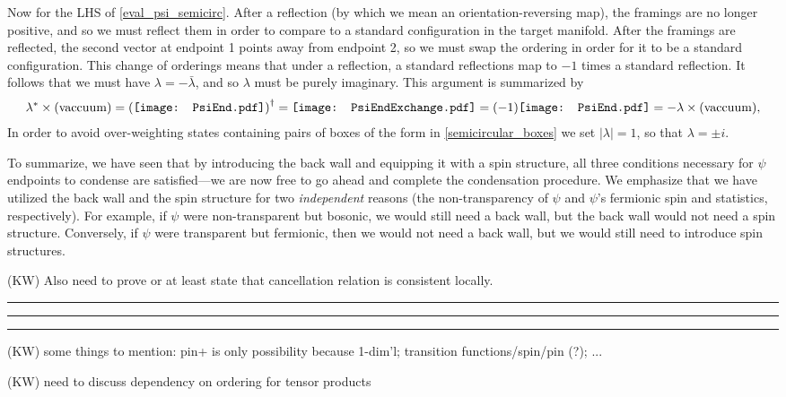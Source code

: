 \documentclass[12pt,a4paper]{article}
\newcommand{\kw}[1]{{\color{kwcolor}\footnotesize{(KW) #1}}}
\newcommand{\kwsep}{\bigskip\hrule\medskip\hrule\medskip\hrule\bigskip}
\newcommand{\PsiEnd}{\mathord{\vcenter{\hbox{\texttt{[image: PsiEnd.pdf]}}}}}
\newcommand{\PsiEndExchange}{\mathord{\vcenter{\hbox{\texttt{[image: PsiEndExchange.pdf]}}}}}
\begin{document}
Now for the LHS of \eqref{eval_psi_semicirc}.
After a reflection (by which we mean an orientation-reversing map), 
the framings are no longer positive, and so we must reflect them in order to compare to a standard configuration
in the target manifold.
After the framings are reflected, the second vector at endpoint 1 points away from endpoint 2,
so we must swap the ordering in order for it to be a standard configuration.
This change of orderings means that under a reflection, a standard reflections map to $-1$ times a standard
reflection.
It follows that we must have $\lambda = -\bar\lambda$, and so $\lambda$ must be purely imaginary.
This argument is summarized by 
\begin{align}
\lambda^{*} \times ({\rm vaccuum}) = \left( \PsiEnd \right) ^{\dagger}  = \PsiEndExchange = (-1) \PsiEnd  = - \lambda \times ({\rm vaccuum}),
\label{phase}
\end{align}
In order to avoid over-weighting states containing pairs of boxes 
of the form in \eqref{semicircular_boxes} we set 
$|\lambda|=1$, so that $\lambda = \pm i$. 

To summarize, we have seen that by introducing the back wall and equipping it with a spin structure, all three 
conditions necessary for $\psi$ endpoints to condense are satisfied---we are now free to go ahead and 
complete the condensation procedure. 
We emphasize that we have utilized the back wall and the spin structure for two {\it independent} reasons 
(the non-transparency of $\psi$ and $\psi$'s fermionic spin and statistics, respectively). 
For example, if $\psi$ were non-transparent but bosonic, we would still need a back wall, but the back wall 
would not need a spin structure.
Conversely, if $\psi$ were transparent but fermionic, then we would not need a back wall, but we would still 
need to introduce spin
structures.

\kw{Also need to prove or at least state that cancellation relation is consistent locally.}

\kwsep


\kw{some things to mention: pin+ is only possibility because 1-dim'l; transition functions/spin/pin (?); ...}

\kw{need to discuss dependency on ordering for tensor products}
\end{document}
